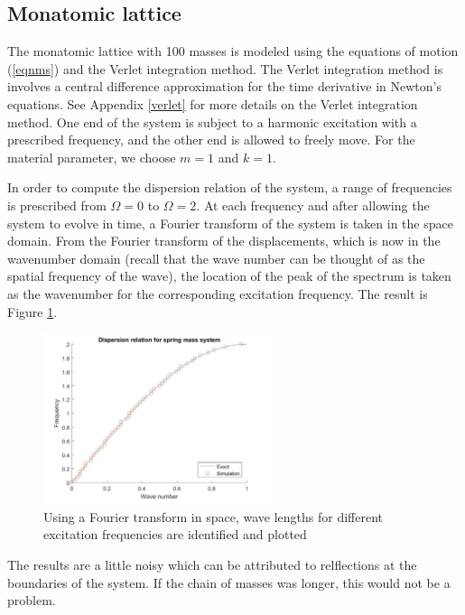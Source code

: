\documentclass{article}
\begin{document}
\subsection{Monatomic lattice}
The monatomic lattice with 100 masses is modeled using the equations of motion 
(\ref{eqnms}) and the Verlet integration method. The Verlet integration method 
is involves a central difference approximation for the time derivative in 
Newton's equations. See Appendix \ref{verlet} for more details on the Verlet 
integration method. One end of the system is subject to a harmonic excitation 
with a prescribed frequency, and the other end is allowed to freely move. For 
the material parameter, we choose $m=1$ and $k=1$.

In order to compute the dispersion relation of the system, a range of 
frequencies is prescribed from $\Omega=0$ to $\Omega=2$. At each frequency and 
after allowing the system to evolve in time, a Fourier transform of the system 
is taken in the space domain. From the Fourier transform of the displacements, 
which is now in the wavenumber domain (recall that the wave number can be 
thought of as the spatial frequency of the wave), the location of the peak of 
the spectrum is taken as the wavenumber for the corresponding excitation 
frequency. The result is Figure \ref{fig:matlab-dr}.
\begin{figure}[!htbp]
	\centering
	\includegraphics[width=0.6\textwidth]{matlab-dr.pdf}
	\caption{Using a Fourier transform in space, wave lengths for different 
	excitation frequencies are identified and plotted}
	\label{fig:matlab-dr}
\end{figure}
The results are a little noisy which can be attributed to relflections at the 
boundaries of the system. If the chain of masses was longer, this would not be 
a problem. 
\end{document}
